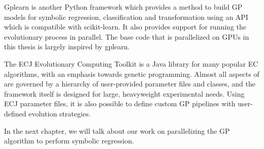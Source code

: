 Gplearn\citep{gplearn} is another Python framework which provides a method to build GP models for symbolic regression, classification and transformation using an API which is compatible with scikit-learn\citep{scikit-learn}. It also provides support for running the evolutionary process in parallel. The base code that is parallelized on GPUs in this thesis is largely inspired by gplearn. 

The ECJ Evolutionary Computing Toolkit\citep{Luke1998ECJSoftware} is a Java library for many popular EC algorithms, with an emphasis towards genetic programming. Almost all aspects of  are governed by a hierarchy of user-provided parameter files and classes, and the framework itself is designed for large, heavyweight experimental needs. Using ECJ parameter files, it is also possible to define custom GP pipelines with user-defined evolution strategies.

In the next chapter, we will talk about our work on parallelizing the GP algorithm to perform symbolic regression.